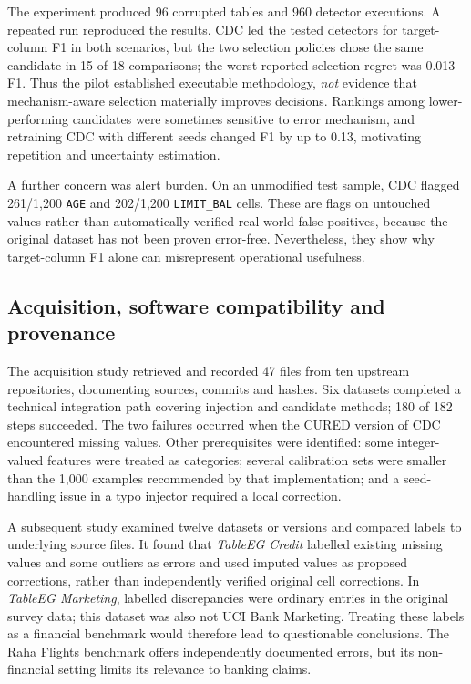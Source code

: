 \documentclass[10pt,a4paper]{article}
\begin{document}
The experiment produced 96 corrupted tables and 960 detector executions. A repeated run reproduced the results. CDC led the tested detectors for target-column F1 in both scenarios, but the two selection policies chose the same candidate in 15 of 18 comparisons; the worst reported selection regret was 0.013 F1. Thus the pilot established executable methodology, \emph{not} evidence that mechanism-aware selection materially improves decisions. Rankings among lower-performing candidates were sometimes sensitive to error mechanism, and retraining CDC with different seeds changed F1 by up to 0.13, motivating repetition and uncertainty estimation.

A further concern was alert burden. On an unmodified test sample, CDC flagged 261/1,200 \texttt{AGE} and 202/1,200 \texttt{LIMIT\_BAL} cells. These are flags on untouched values rather than automatically verified real-world false positives, because the original dataset has not been proven error-free. Nevertheless, they show why target-column F1 alone can misrepresent operational usefulness.

\subsection{Acquisition, software compatibility and provenance}
The acquisition study retrieved and recorded 47 files from ten upstream repositories, documenting sources, commits and hashes. Six datasets completed a technical integration path covering injection and candidate methods; 180 of 182 steps succeeded. The two failures occurred when the CURED version of CDC encountered missing values. Other prerequisites were identified: some integer-valued features were treated as categories; several calibration sets were smaller than the 1,000 examples recommended by that implementation; and a seed-handling issue in a typo injector required a local correction.

A subsequent study examined twelve datasets or versions and compared labels to underlying source files. It found that \emph{TableEG Credit} labelled existing missing values and some outliers as errors and used imputed values as proposed corrections, rather than independently verified original cell corrections. In \emph{TableEG Marketing}, labelled discrepancies were ordinary entries in the original survey data; this dataset was also not UCI Bank Marketing. Treating these labels as a financial benchmark would therefore lead to questionable conclusions. The Raha Flights benchmark offers independently documented errors, but its non-financial setting limits its relevance to banking claims.
\end{document}
